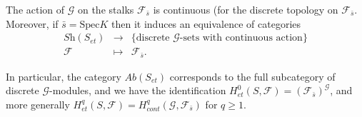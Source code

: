 \begin{theorem}
\label{theorem-equivalence-sheaves-point}
The action of $\mathcal{G}$ on the stalks $\mathcal{F}_{\bar s}$ is continuous
(for the discrete topology on $\mathcal{F}_{\bar s}$. Moreover, if $\bar s=
\text{Spec} K$ then it induces an equivalence of categories
$$
\begin{matrix}
\textit{Sh}(S_{et}) & \longrightarrow & \{ \text{discrete $\mathcal{G}$-sets
with continuous action} \} \\
\mathcal{F} & \longmapsto & \mathcal{F}_{\bar s}.
\end{matrix}
$$
\end{theorem}

\noindent
In particular, the category $\textit{Ab}(S_{et})$ corresponds to the full
subcategory of discrete $\mathcal{G}$-modules, and we have the identification
$H_{et}^0(S,\mathcal{F}) = (\mathcal{F}_{\bar s})^\mathcal{G}$, and more
generally $H_{et}^q(S,\mathcal{F}) = H_{cont}^q (\mathcal{G}, \mathcal{F}_{\bar
s})$ for $q \geq 1$.







